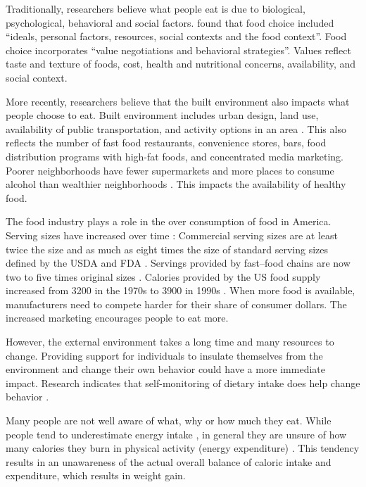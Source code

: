 Traditionally, researchers believe what people eat is due to biological, psychological, behavioral and social factors. \citet{furst_food_1996} found that food choice included ``ideals, personal factors, resources, social contexts and the food context''. Food choice incorporates ``value negotiations and behavioral strategies''. Values reflect taste and texture of foods, cost, health and nutritional concerns, availability, and social context. 

More recently, researchers believe that the built environment also impacts what people choose to eat. Built environment includes urban design, land use, availability of public transportation, and activity options in an area \citep{Booth2005}. This also reflects the number of fast food restaurants, convenience stores, bars, food distribution programs with high-fat foods, and concentrated media marketing. Poorer neighborhoods have fewer supermarkets and more places to consume alcohol than wealthier neighborhoods \citep{Morland2002}. This impacts the availability of healthy food. 

The food industry plays a role in the over consumption of food in America. Serving sizes have increased over time \citep{Nielsen2003}: Commercial serving sizes are at least twice the size and as much as eight times the size of standard serving sizes defined by the USDA and FDA \citep{Young2003, Nielsen2003}. Servings provided by fast--food chains are now two to five times original sizes \citep{Young2003}. Calories provided by the US food supply increased from 3200 in the 1970s to 3900 in 1990s \citep{Nestle2002}. When more food is available, manufacturers need to compete harder for their share of consumer dollars. The increased marketing encourages people to eat more. 

However, the external environment takes a long time and many resources to change. Providing support for individuals to insulate themselves from the environment and change their own behavior could have a more immediate impact.  \citep{Hill2006}
Research indicates that self-monitoring of dietary intake does help change behavior \citep{burke_experiences_2009,burke_self-monitoring_2005, burke_self-monitoring_2011}. 

Many people are not well aware of what, why or how much they eat.   While people tend to underestimate energy intake \citep{Schoeller199518,Black1991583,Livingstone1990}, in general they are unsure of how many calories they burn in physical activity (energy expenditure) \citep{Prince2008}. This tendency results in an unawareness of the actual overall balance of caloric intake and expenditure, which results in weight gain. 

